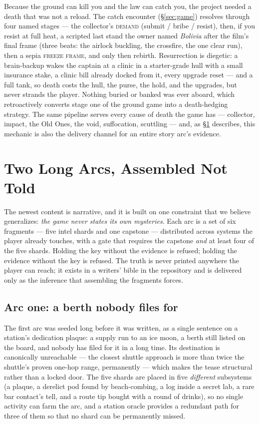 \documentclass[10pt,twocolumn]{article}
\begin{document}
Because the ground can kill you and the law can catch you, the project needed a death that
was not a reload. The catch encounter (\S\ref{sec:game}) resolves through four named stages
--- the collector's \textsc{demand} (submit / bribe / resist), then, if you resist at full
heat, a scripted last stand the owner named \emph{Bolivia} after the film's final frame
(three beats: the airlock buckling, the crossfire, the one clear run), then a sepia
\textsc{freeze frame}, and only then rebirth. Resurrection is diegetic: a brain-backup wakes
the captain at a clinic in a starter-grade hull with a small insurance stake, a clinic bill
already docked from it, every upgrade reset --- and a full tank, so death costs the hull, the
purse, the hold, and the upgrades, but never strands the player. Nothing buried or banked was
ever aboard, which retroactively converts stage one of the ground game into a death-hedging
strategy. The same pipeline serves every cause of death the game has --- collector, impact,
the Old Ones, the void, suffocation, scuttling --- and, as \S\ref{sec:arcs} describes, this
mechanic is also the delivery channel for an entire story arc's evidence.

\section{Two Long Arcs, Assembled Not Told}
\label{sec:arcs}

The newest content is narrative, and it is built on one constraint that we believe
generalizes: \emph{the game never states its own mysteries}. Each arc is a set of six
fragments --- five intel shards and one capstone --- distributed across systems the player
already touches, with a gate that requires the capstone \emph{and} at least four of the five
shards. Holding the key without the evidence is refused; holding the evidence without the key
is refused. The truth is never printed anywhere the player can reach; it exists in a writers'
bible in the repository and is delivered only as the inference that assembling the fragments
forces.

\subsection{Arc one: a berth nobody files for}

The first arc was seeded long before it was written, as a single sentence on a station's
dedication plaque: a supply run to an ice moon, a berth still listed on the board, and nobody
has filed for it in a long time. Its destination is canonically unreachable --- the closest
shuttle approach is more than twice the shuttle's proven one-hop range, permanently --- which
makes the tease structural rather than a locked door. The five shards are placed in five
\emph{different} subsystems (a plaque, a derelict pod found by beach-combing, a log inside a
secret lab, a rare bar contact's tell, and a route tip bought with a round of drinks), so no
single activity can farm the arc, and a station oracle provides a redundant path for three of
them so that no shard can be permanently missed.
\end{document}
